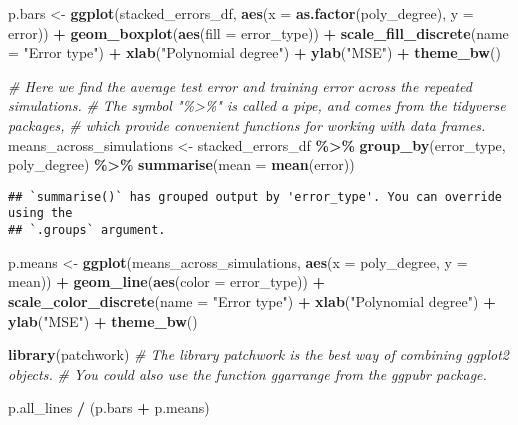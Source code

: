 \documentclass[
]{article}
\newenvironment{Shaded}{\begin{snugshade}}{\end{snugshade}}
\newcommand{\AttributeTok}[1]{\textcolor[rgb]{0.13,0.29,0.53}{#1}}
\newcommand{\CommentTok}[1]{\textcolor[rgb]{0.56,0.35,0.01}{\textit{#1}}}
\newcommand{\FunctionTok}[1]{\textcolor[rgb]{0.13,0.29,0.53}{\textbf{#1}}}
\newcommand{\NormalTok}[1]{#1}
\newcommand{\OtherTok}[1]{\textcolor[rgb]{0.56,0.35,0.01}{#1}}
\newcommand{\SpecialCharTok}[1]{\textcolor[rgb]{0.81,0.36,0.00}{\textbf{#1}}}
\newcommand{\StringTok}[1]{\textcolor[rgb]{0.31,0.60,0.02}{#1}}
\begin{document}
\begin{Shaded}
\begin{Highlighting}[]
\NormalTok{p.bars }\OtherTok{\textless{}{-}} \FunctionTok{ggplot}\NormalTok{(stacked\_errors\_df, }\FunctionTok{aes}\NormalTok{(}\AttributeTok{x =} \FunctionTok{as.factor}\NormalTok{(poly\_degree), }\AttributeTok{y =}\NormalTok{ error)) }\SpecialCharTok{+}
  \FunctionTok{geom\_boxplot}\NormalTok{(}\FunctionTok{aes}\NormalTok{(}\AttributeTok{fill =}\NormalTok{ error\_type)) }\SpecialCharTok{+}
  \FunctionTok{scale\_fill\_discrete}\NormalTok{(}\AttributeTok{name =} \StringTok{"Error type"}\NormalTok{) }\SpecialCharTok{+}
  \FunctionTok{xlab}\NormalTok{(}\StringTok{"Polynomial degree"}\NormalTok{) }\SpecialCharTok{+}
  \FunctionTok{ylab}\NormalTok{(}\StringTok{"MSE"}\NormalTok{) }\SpecialCharTok{+}
  \FunctionTok{theme\_bw}\NormalTok{()}

\CommentTok{\# Here we find the average test error and training error across the repeated simulations. }
\CommentTok{\# The symbol "\%\textgreater{}\%" is called a pipe, and comes from the tidyverse packages, }
\CommentTok{\# which provide convenient functions for working with data frames.}
\NormalTok{means\_across\_simulations }\OtherTok{\textless{}{-}}\NormalTok{ stacked\_errors\_df }\SpecialCharTok{\%\textgreater{}\%} 
  \FunctionTok{group\_by}\NormalTok{(error\_type, poly\_degree) }\SpecialCharTok{\%\textgreater{}\%} 
  \FunctionTok{summarise}\NormalTok{(}\AttributeTok{mean =} \FunctionTok{mean}\NormalTok{(error))}
\end{Highlighting}
\end{Shaded}

\begin{verbatim}
## `summarise()` has grouped output by 'error_type'. You can override using the
## `.groups` argument.
\end{verbatim}

\begin{Shaded}
\begin{Highlighting}[]
\NormalTok{p.means }\OtherTok{\textless{}{-}} \FunctionTok{ggplot}\NormalTok{(means\_across\_simulations, }\FunctionTok{aes}\NormalTok{(}\AttributeTok{x =}\NormalTok{ poly\_degree, }\AttributeTok{y =}\NormalTok{ mean)) }\SpecialCharTok{+}
  \FunctionTok{geom\_line}\NormalTok{(}\FunctionTok{aes}\NormalTok{(}\AttributeTok{color =}\NormalTok{ error\_type)) }\SpecialCharTok{+}
  \FunctionTok{scale\_color\_discrete}\NormalTok{(}\AttributeTok{name =} \StringTok{"Error type"}\NormalTok{) }\SpecialCharTok{+}
  \FunctionTok{xlab}\NormalTok{(}\StringTok{"Polynomial degree"}\NormalTok{) }\SpecialCharTok{+}
  \FunctionTok{ylab}\NormalTok{(}\StringTok{"MSE"}\NormalTok{) }\SpecialCharTok{+}
  \FunctionTok{theme\_bw}\NormalTok{()}

\FunctionTok{library}\NormalTok{(patchwork) }\CommentTok{\# The library patchwork is the best way of combining ggplot2 objects. }
\CommentTok{\# You could also use the function ggarrange from the ggpubr package.}

\NormalTok{p.all\_lines }\SpecialCharTok{/}\NormalTok{ (p.bars }\SpecialCharTok{+}\NormalTok{ p.means)}
\end{Highlighting}
\end{Shaded}
\end{document}
